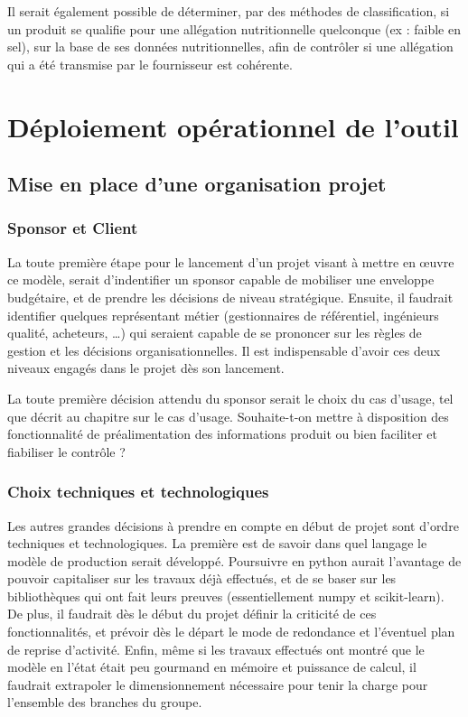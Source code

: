     Il serait également possible de déterminer, par des méthodes de classification, si un produit se qualifie pour une allégation nutritionnelle quelconque (ex : faible en sel), sur la base de ses données nutritionnelles, afin de contrôler si une allégation qui a été transmise par le fournisseur est cohérente.

    \chapter{Déploiement opérationnel de l'outil}    

        \section{Mise en place d'une organisation projet}
            
            \subsection{Sponsor et Client}

            La toute première étape pour le lancement d'un projet visant à mettre en \oe uvre ce modèle, serait d'indentifier un sponsor capable de mobiliser une enveloppe budgétaire, et de prendre les décisions de niveau stratégique.
            Ensuite, il faudrait identifier quelques représentant métier (gestionnaires de référentiel, ingénieurs qualité, acheteurs, \dots) qui seraient capable de se prononcer sur les règles de gestion et les décisions organisationnelles.
            Il est indispensable d'avoir ces deux niveaux engagés dans le projet dès son lancement.

            La toute première décision attendu du sponsor serait le choix du cas d'usage, tel que décrit au chapitre  sur le cas d'usage.
            Souhaite-t-on mettre à disposition des fonctionnalité de préalimentation des informations produit ou bien faciliter et fiabiliser le contrôle ?

            \subsection{Choix techniques et technologiques}

            Les autres grandes décisions à prendre en compte en début de projet sont d'ordre techniques et technologiques.
            La première est de savoir dans quel langage le modèle de production serait développé.
            Poursuivre en python aurait l'avantage de pouvoir capitaliser sur les travaux déjà effectués, et de se baser sur les bibliothèques qui ont fait leurs preuves (essentiellement numpy et scikit-learn).
            De plus, il faudrait dès le début du projet définir la criticité de ces fonctionnalités, et prévoir dès le départ le mode de redondance et l'éventuel plan de reprise d'activité.
            Enfin, même si les travaux effectués ont montré que le modèle en l'état était peu gourmand en mémoire et puissance de calcul, il faudrait extrapoler le dimensionnement nécessaire pour tenir la charge pour l'ensemble des branches du groupe.


